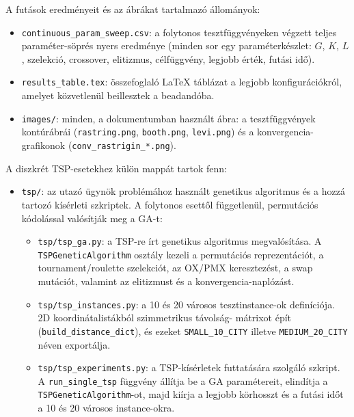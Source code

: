 \documentclass[a4paper,12pt]{article}
\begin{document}
A futások eredményeit és az ábrákat tartalmazó állományok:

\begin{itemize}
  \item \texttt{continuous\_param\_sweep.csv}: a folytonos tesztfüggvényeken
        végzett teljes paraméter-söprés nyers eredménye (minden sor egy
        paraméterkészlet: $G$, $K$, $L$, szelekció, crossover, elitizmus,
        célfüggvény, legjobb érték, futási idő).
  \item \texttt{results\_table.tex}: összefoglaló LaTeX táblázat a
        legjobb konfigurációkról, amelyet közvetlenül beillesztek a
        beadandóba.
  \item \texttt{images/}: minden, a dokumentumban használt ábra:
        a tesztfüggvények kontúrábrái (\texttt{rastring.png},
        \texttt{booth.png}, \texttt{levi.png}) és a konvergencia-grafikonok
        (\texttt{conv\_rastrigin\_*.png}).
\end{itemize}

A diszkrét TSP-esetekhez külön mappát tartok fenn:

\begin{itemize}
  \item \texttt{tsp/}: az utazó ügynök problémához használt genetikus algoritmus
        és a hozzá tartozó kísérleti szkriptek. A folytonos esettől függetlenül,
        permutációs kódolással valósítják meg a GA-t:
        \begin{itemize}
          \item \texttt{tsp/tsp\_ga.py}: a TSP-re írt genetikus algoritmus 
                megvalósítása. A \texttt{TSPGeneticAlgorithm} osztály
                kezeli a permutációs reprezentációt, a tournament/roulette
                szelekciót, az OX/PMX keresztezést, a swap mutációt,
                valamint az elitizmust és a konvergencia-naplózást.
          \item \texttt{tsp/tsp\_instances.py}: a 10 és 20 városos tesztinstance-ok
                definíciója. 2D koordinátalistákból szimmetrikus távolság-
                mátrixot épít (\texttt{build\_distance\_dict}), és ezeket
                \texttt{SMALL\_10\_CITY} illetve \texttt{MEDIUM\_20\_CITY}
                néven exportálja.
          \item \texttt{tsp/tsp\_experiments.py}: a TSP-kísérletek futtatására
                szolgáló szkript. A \texttt{run\_single\_tsp} függvény állítja be
                a GA paramétereit, elindítja a \texttt{TSPGeneticAlgorithm}-ot,
                majd kiírja a legjobb körhosszt és a futási időt a 10 és
                20 városos instance-okra.
        \end{itemize}
\end{itemize}
\end{document}
